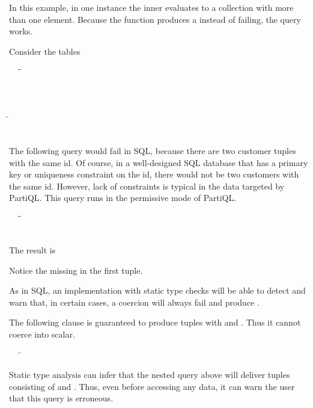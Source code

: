 \begin{example} 
\label{xmpl:coercion-failure}
In this example, in one instance the inner  evaluates to a collection
with more than one element. Because the  function produces a
\MISSING instead of failing, the query works. 

Consider the tables
\begin{tabbing}
\ \ \ \=\gt{customers : [}\=\\
\>\>\\
\>\>\\
\>\>\gt{]}\\
\>\gt{orders : [}\=\\
\>\>\\
\>\>\gt{]}
\end{tabbing}

The following query would fail in SQL, because there are two customer tuples
with the same id. Of course, in a well-designed SQL database that has a primary
key or uniqueness constraint on the id, there would not be two customers with
the same id. However, lack of constraints is typical in the data targeted by
PartiQL. This query runs in the permissive mode of PartiQL.

\begin{tabbing}
\ \ \ \=\=\\
\>\>\\ 
\>
\end{tabbing}
The result is
\begin{tabbing}
\end{tabbing}
\noindent Notice the missing  in the first tuple.
\end{example} 

As in SQL, an implementation with static type checks will be able to detect and
warn that, in certain cases, a coercion will always fail and produce
. 

\begin{example}
The following  clause is guaranteed to produce tuples with 
and . Thus it cannot coerce into scalar. 
\begin{tabbing}
\ \ \ \=\\
\>
\end{tabbing}
Static type analysis can infer that the nested query above will deliver tuples
consisting of  and . Thus, even before accessing any data, it
can warn the user that this query is erroneous.
\end{example}

